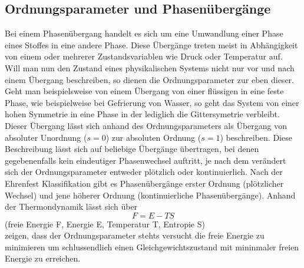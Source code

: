     \subsection{Ordnungsparameter und Phasenübergänge}
        Bei einem Phasenübergang handelt es sich um eine Umwandlung einer Phase eines Stoffes in 
        eine andere Phase. Diese Übergänge treten meist in Abhängigkeit von einem oder mehrerer Zustandsvariablen
        wie Druck oder Temperatur auf.\\
        Will man nun den Zustand eines physikalischen Systems nicht nur vor und nach einem Übergang beschreiben,
        so dienen die Ordnungsparameter zur eben dieser. Geht man beispielsweise von einem Übergang von einer
        flüssigen in eine feste Phase, wie beispielweise bei Gefrierung von Wasser, so geht das System von einer
        hohen Symmetrie in eine Phase in der lediglich die Gittersymetrie verbleibt. Dieser Übergang lässt sich
        anhand des Ordnungsparameters als Übergang von absoluter Unordnung ($s=0$) zur absoluten Ordnung
        ($s=1$) beschreiben. Diese Beschreibung lässt sich auf beliebige Übergänge übertragen, bei denen
        gegebenenfalls kein eindeutiger Phasenwechsel auftritt, je nach dem verändert sich der Ordnungsparameter
        entweder plötzlich oder kontinuierlich. Nach der Ehrenfest Klassifikation gibt es Phasenübergänge erster Ordnung (plötzlicher Wechsel) und jene 
        höherer Ordnung (kontinuierliche Phasenübergänge).
        Anhand der Thermondynamik lässt sich über
        \begin{equation}
            F = E-TS
        \end{equation}
        (freie Energie F, Energie E, Temperatur T, Entropie S)\\
        zeigen, dass der Ordnungsparameter stehts versucht die freie Energie zu minimieren um schlussendlich
        einen Gleichgewichtszustand mit mininmaler freien Energie zu erreichen.

